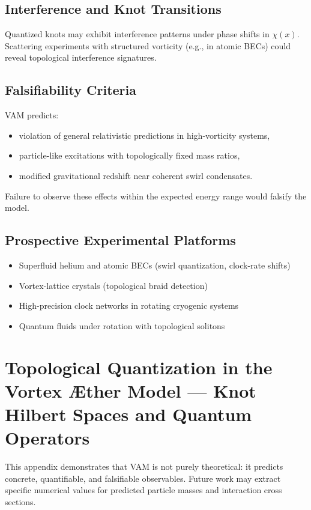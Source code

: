         \subsection{Interference and Knot Transitions}
        Quantized knots may exhibit interference patterns under phase shifts in $\chi(x)$. Scattering experiments with structured vorticity (e.g., in atomic BECs) could reveal topological interference signatures.

        \subsection{Falsifiability Criteria}
        VAM predicts:
        \begin{itemize}
            \item violation of general relativistic predictions in high-vorticity systems,
            \item particle-like excitations with topologically fixed mass ratios,
            \item modified gravitational redshift near coherent swirl condensates.
        \end{itemize}
        Failure to observe these effects within the expected energy range would falsify the model.

        \subsection{Prospective Experimental Platforms}
        \begin{itemize}
            \item Superfluid helium and atomic BECs (swirl quantization, clock-rate shifts)
            \item Vortex-lattice crystals (topological braid detection)
            \item High-precision clock networks in rotating cryogenic systems
            \item Quantum fluids under rotation with topological solitons
        \end{itemize}


\section{Topological Quantization in the Vortex Æther Model — Knot Hilbert Spaces and Quantum Operators}
    This appendix demonstrates that VAM is not purely theoretical: it predicts concrete, quantifiable, and falsifiable observables. Future work may extract specific numerical values for predicted particle masses and interaction cross sections.

